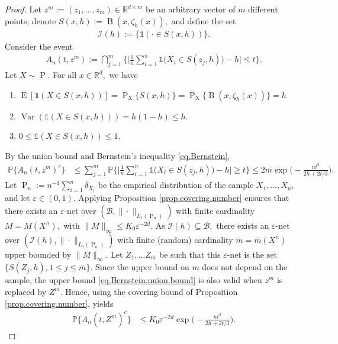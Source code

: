 \documentclass[10pt]{article}
\newcommand{\eps}{\varepsilon}
\newcommand{\mB}{\mathcal{B}}
\newcommand{\mI}{\mathcal{I}}
\newcommand{\PP}{\mathbb{P}}
\newcommand{\RR}{\mathbb{R}}
\newcommand{\B}{\operatorname{B}}
\newcommand{\E}{\operatorname{E}}
\renewcommand{\P}{\operatorname{P}}
\newcommand{\ol}{\overline}
\newcommand{\Var}{\operatorname{Var}}
\newcommand{\sX}{\mathrm{X}}
\begin{document}
\begin{proof}
    Let $z^m := (z_1, \dots, z_m) \in \RR^{d\times m}$ be an arbitrary vector of $m$ different points, denote $S(x, h) := \B(x, \zeta_h(x)),$ and define the set
    \begin{align*}
        \mI(h) := \bigg\{\mathds{1}(\cdot \in S(x, h))\bigg\}.
    \end{align*}
    Consider the event
    \begin{align*}
        A_n(t, z^m) := \bigcap_{j=1}^m\bigg\{\Big|\frac 1n \sum_{i=1}^n \mathds{1}\big(X_i \in S(z_j, h)\big) - h \Big|\leq t\bigg\}.
    \end{align*}
    Let $X \sim \P.$ For all $x \in \RR^d,$ we have
    \begin{enumerate}
        \item [$(i)$] $\E[\mathds{1}(X \in S(x, h))] = \P_{\sX}\{S(x, h)\} = \P_{\sX}\{\B(x, \zeta_h(x))\} = h$
        \item [$(ii)$] $\Var(\mathds{1}(X \in S(x, h))) = h(1 - h) \leq h.$
        \item [$(iii)$] $0 \leq \mathds{1}(X \in S(x, h)) \leq 1.$
    \end{enumerate}
    By the union bound and Bernstein's inequality \eqref{eq.Bernstein}, 
    \begin{align}
        \label{eq.Bernstein.union.bound}
        \PP\big\{A_n(t, z^m)^c\big\} &\leq \sum_{j=1}^m \PP\bigg\{\Big|\frac 1n \sum_{i=1}^n \mathds{1}\big(X_i \in S(z_j, h)\big) - h \Big|\geq t\bigg\} \leq 2m\exp\bigg(-\frac{nt^2}{2h + 2t/3}\bigg).
    \end{align}
    Let $\P_n := n^{-1}\sum_{i=1}^n \delta_{X_i}$ be the empirical distribution of the sample $X_1, \dots, X_n,$ and let $\eps \in (0, 1).$ Applying Proposition \ref{prop.covering.number} ensures that there exists an $\eps$-net over $(\mB, \|\cdot\|_{L_1(\P_n)})$ with finite cardinality $M = M(X^n),$ with $\|M\|_\infty \leq K_0\eps^{-2d}.$ As $\mI(h) \subseteq \mB,$ there exists an $\eps$-net over $(\mI(h), \|\cdot\|_{L_1(\P_n)})$ with finite (random) cardinality $\ol m = \ol m(X^n)$ upper bounded by $\|M\|_{\infty}.$  Let $Z_1, \dots Z_{\ol m}$ be such that this $\eps$-net is the set $\big\{S(Z_j, h), 1\leq j\leq \ol m\big\}.$ Since the upper bound on $m$ does not depend on the sample, the upper bound \eqref{eq.Bernstein.union.bound} is also valid when $z^m$ is replaced by $Z^{\ol m}.$ Hence, using the covering bound of Proposition \ref{prop.covering.number}, yields
    \begin{align*}
        \PP\big\{A_n(t, Z^{\ol m})^c\big\}&\leq K_0\eps^{-2d}\exp\bigg(-\frac{nt^2}{2h + 2t/3}\bigg).

\end{align*}
\end{proof}
\end{document}
